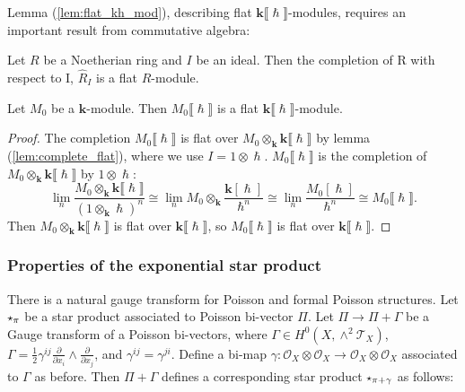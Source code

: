     
    Lemma (\ref{lem:flat_kh_mod}), describing flat \( \mathbf{k}\lBrack\hslash\rBrack\)-modules, requires an important result from commutative algebra:
    \begin{lem} 
    \label{lem:complete_flat}
    Let \(R\) be a Noetherian ring and \(I\) be an ideal. Then the completion of R with respect to I, \(\widehat{R}_I\) is a flat \(R\)-module.
    \end{lem}



    \begin{lem}
    \label{lem:flat_kh_mod}
    Let \(M_0\) be a \(\mathbf{k}\)-module. Then \( M_0 \lBrack \hslash \rBrack\) is a flat \( \mathbf{k}\lBrack \hslash\rBrack\)-module.
    \end{lem}

    \begin{proof}
    The completion \(M_0 \lBrack \hslash \rBrack\) is flat over \(M_0 \otimes_{\mathbf{k}} \mathbf{k}\lBrack \hslash \rBrack \) by lemma (\ref{lem:complete_flat}), where we use \(I = 1 \otimes \hslash\).  \(M_0 \lBrack \hslash\rBrack\) is the completion of \(M_0 \otimes_{\mathbf{k}} \mathbf{k}\lBrack \hslash \rBrack\) by \( 1 \otimes \hslash\): 
    \[ \lim_n \frac{M_0  \otimes_{\mathbf{k}} \mathbf{k}\lBrack \hslash \rBrack }{\left(1 \otimes_{\mathbf{k}} \hslash\right)^n} \cong \lim_n M_0 \otimes_{\mathbf{k}}  \frac{\mathbf{k}[\hslash]}{\hslash^n} \cong \lim_n \frac{M_0[\hslash]}{\hslash^n} \cong M_0 \lBrack\hslash\rBrack.\] 
    Then \(M_0 \otimes_{\mathbf{k}} \mathbf{k} \lBrack \hslash \rBrack \) is flat over \( \mathbf{k} \lBrack \hslash\rBrack\), so \(M_0 \lBrack \hslash \rBrack\) is flat over \( \mathbf{k} \lBrack \hslash \rBrack\).
    \end{proof}
    
    
    

    \subsubsection{Properties of the exponential star product}
    
    
    There is a natural gauge transform for Poisson and formal Poisson structures. 
    Let \( \starp_{\pi}\) be a star product associated to Poisson bi-vector \( \Pi\).
    Let \( \Pi \rightarrow \Pi + \Gamma \) be a Gauge transform of a Poisson bi-vectors, where \( \Gamma \in H^0(X,\wedge^2 \mathcal{T}_X)\), 
    \( \Gamma = \frac{1}{2} \gamma^{ij} \frac{\partial}{\partial x_i } \wedge \frac{\partial}{\partial x_j}\), and \( \gamma^{ij} = \gamma^{ji}\). Define a bi-map \( \gamma : \mathcal{O}_X \otimes \mathcal{O}_X \rightarrow \mathcal{O}_X \otimes \mathcal{O}_X\) associated to \( \Gamma \) as before. Then \( \Pi + \Gamma \) defines a corresponding star product \( \starp_{\pi + \gamma}\) as follows:
    
